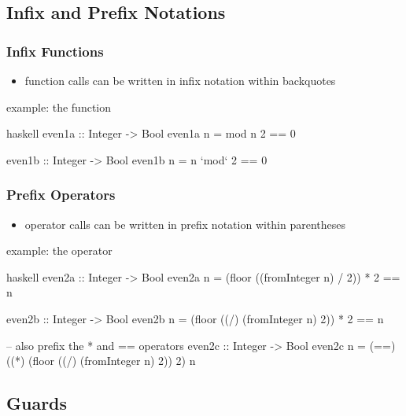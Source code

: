 \documentclass[dvipsnames]{beamer}
\theoremstyle{plain}
\begin{document}
\subsection{Infix and Prefix Notations}

\begin{frame}[fragile]
  \frametitle{Infix Functions}

  \begin{itemize}
    \item function calls can be written in infix notation within backquotes
  \end{itemize}

  \begin{exampleblock}{example: the  function}
    \begin{pygments}{haskell}
even1a :: Integer -> Bool
even1a n = mod n 2 == 0

even1b :: Integer -> Bool
even1b n = n `mod` 2 == 0
    \end{pygments}
  \end{exampleblock}
\end{frame}

\begin{frame}[fragile]
  \frametitle{Prefix Operators}

  \begin{itemize}
    \item operator calls can be written in prefix notation within parentheses
  \end{itemize}

  \begin{exampleblock}{example: the  operator}
    \begin{pygments}{haskell}
even2a :: Integer -> Bool
even2a n = (floor ((fromInteger n) / 2)) * 2 == n

even2b :: Integer -> Bool
even2b n = (floor ((/) (fromInteger n) 2)) * 2 == n

-- also prefix the * and == operators
even2c :: Integer -> Bool
even2c n =
    (==) ((*) (floor ((/) (fromInteger n) 2)) 2) n
    \end{pygments}
  \end{exampleblock}
\end{frame}

\subsection{Guards}
\end{document}

